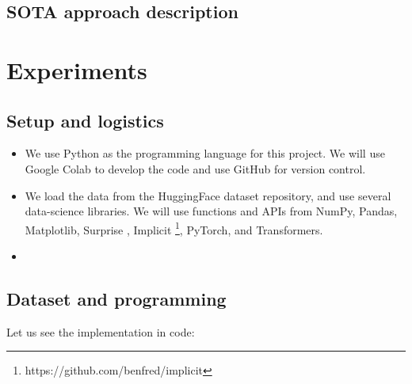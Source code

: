 \documentclass{article}
\begin{document}
\subsection{SOTA approach description}



\section{Experiments}
\subsection{Setup and logistics}
\begin{itemize}
    \item We use Python as the programming language for this project. We will use Google Colab to develop the code and use GitHub for version control.
    \item We load the data from the HuggingFace dataset repository, and use several data-science libraries. We will use functions and APIs from NumPy, Pandas, Matplotlib, Surprise \cite{surprise}, Implicit \footnote{https://github.com/benfred/implicit}, PyTorch, and Transformers.
    \item 
\end{itemize}

\subsection{Dataset and programming}

Let us see the implementation in code:


\end{document}
